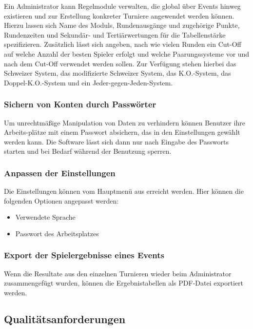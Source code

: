 \documentclass[11pt]{article}
\begin{document}
Ein Administrator kann Regelmodule verwalten, die global über Events hinweg existieren und zur Erstellung konkreter Turniere angewendet werden können. Hierzu lassen sich Name des Moduls, Rundenausgänge und zugehörige Punkte, Rundenzeiten und Sekundär- und Tertiärwertungen für die Tabellenstärke spezifizieren. Zusätzlich lässt sich angeben, nach wie vielen Runden ein Cut-Off auf welche Anzahl der besten Spieler erfolgt und welche Paarungssysteme vor und nach dem Cut-Off verwendet werden sollen. Zur Verfügung stehen hierbei das Schweizer System, das modifizierte Schweizer System, das K.O.-System, das Doppel-K.O.-System und ein Jeder-gegen-Jeden-System.

\subsubsection{Sichern von Konten durch Passwörter}

Um unrechtmäßige Manipulation von Daten zu verhindern können Benutzer ihre Arbeits-plätze mit einem Passwort absichern, das in den Einstellungen gewählt werden kann. Die Software lässt sich dann nur nach Eingabe des Passworts starten und bei Bedarf während der Benutzung sperren.

\subsubsection{Anpassen der Einstellungen}

Die Einstellungen können vom Hauptmenü aus erreicht werden. Hier können die folgenden Optionen angepasst werden:
\begin{itemize}
	\item Verwendete Sprache
	\item Passwort des Arbeitsplatzes
\end{itemize}

\subsubsection{Export der Spielergebnisse eines Events}

Wenn die Resultate aus den einzelnen Turnieren wieder beim Administrator zusammengefügt wurden, können die Ergebnistabellen als PDF-Datei exportiert werden.

\subsection{Qualitätsanforderungen}
\end{document}
